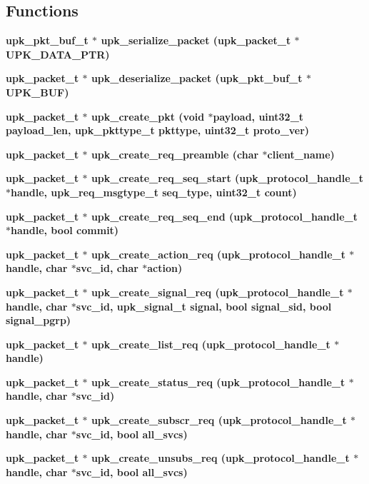 \subsection*{Functions}
\begin{CompactItemize}
\item 
\bf{upk\_\-pkt\_\-buf\_\-t} $\ast$ \bf{upk\_\-serialize\_\-packet} (\bf{upk\_\-packet\_\-t} $\ast$UPK\_\-DATA\_\-PTR)
\item 
\bf{upk\_\-packet\_\-t} $\ast$ \bf{upk\_\-deserialize\_\-packet} (\bf{upk\_\-pkt\_\-buf\_\-t} $\ast$UPK\_\-BUF)
\item 
\bf{upk\_\-packet\_\-t} $\ast$ \bf{upk\_\-create\_\-pkt} (void $\ast$payload, uint32\_\-t payload\_\-len, \bf{upk\_\-pkttype\_\-t} pkttype, uint32\_\-t proto\_\-ver)
\item 
\bf{upk\_\-packet\_\-t} $\ast$ \bf{upk\_\-create\_\-req\_\-preamble} (char $\ast$client\_\-name)
\item 
\bf{upk\_\-packet\_\-t} $\ast$ \bf{upk\_\-create\_\-req\_\-seq\_\-start} (\bf{upk\_\-protocol\_\-handle\_\-t} $\ast$handle, \bf{upk\_\-req\_\-msgtype\_\-t} seq\_\-type, uint32\_\-t count)
\item 
\bf{upk\_\-packet\_\-t} $\ast$ \bf{upk\_\-create\_\-req\_\-seq\_\-end} (\bf{upk\_\-protocol\_\-handle\_\-t} $\ast$handle, bool commit)
\item 
\bf{upk\_\-packet\_\-t} $\ast$ \bf{upk\_\-create\_\-action\_\-req} (\bf{upk\_\-protocol\_\-handle\_\-t} $\ast$handle, char $\ast$svc\_\-id, char $\ast$action)
\item 
\bf{upk\_\-packet\_\-t} $\ast$ \bf{upk\_\-create\_\-signal\_\-req} (\bf{upk\_\-protocol\_\-handle\_\-t} $\ast$handle, char $\ast$svc\_\-id, \bf{upk\_\-signal\_\-t} signal, bool signal\_\-sid, bool signal\_\-pgrp)
\item 
\bf{upk\_\-packet\_\-t} $\ast$ \bf{upk\_\-create\_\-list\_\-req} (\bf{upk\_\-protocol\_\-handle\_\-t} $\ast$handle)
\item 
\bf{upk\_\-packet\_\-t} $\ast$ \bf{upk\_\-create\_\-status\_\-req} (\bf{upk\_\-protocol\_\-handle\_\-t} $\ast$handle, char $\ast$svc\_\-id)
\item 
\bf{upk\_\-packet\_\-t} $\ast$ \bf{upk\_\-create\_\-subscr\_\-req} (\bf{upk\_\-protocol\_\-handle\_\-t} $\ast$handle, char $\ast$svc\_\-id, bool all\_\-svcs)
\item 
\bf{upk\_\-packet\_\-t} $\ast$ \bf{upk\_\-create\_\-unsubs\_\-req} (\bf{upk\_\-protocol\_\-handle\_\-t} $\ast$handle, char $\ast$svc\_\-id, bool all\_\-svcs)
\item 

\end{CompactItemize}

